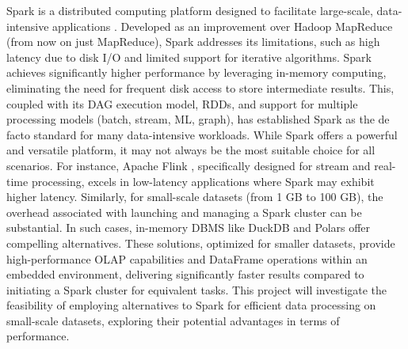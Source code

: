 \smallskip

Spark is a distributed computing platform designed to facilitate large-scale, data-intensive applications \cite{zaharia2010spark}. Developed as an improvement over Hadoop MapReduce (from now on just MapReduce), Spark addresses its limitations, such as high latency due to disk I/O and limited support for iterative algorithms. Spark achieves significantly higher performance by leveraging in-memory computing, eliminating the need for frequent disk access to store intermediate results. This, coupled with its DAG execution model, \glspl{RDD}, and support for multiple processing models (batch, stream, \gls{ML}, graph), has established Spark as the de facto standard for many data-intensive workloads.
While Spark offers a powerful and versatile platform, it may not always be the most suitable choice for all scenarios. For instance, Apache Flink \cite{carboneApacheFlinkStream}, specifically designed for stream and real-time processing, excels in low-latency applications where Spark may exhibit higher latency. Similarly, for small-scale datasets (from 1 GB to 100 GB), the overhead associated with launching and managing a Spark cluster can be substantial. In such cases, in-memory \gls{DBMS} like DuckDB \cite{raasveldtDuckDBEmbeddableAnalytical2019} and Polars \cite{vinkWroteOneFastest2021} offer compelling alternatives. These solutions, optimized for smaller datasets, provide high-performance OLAP capabilities and DataFrame operations within an embedded environment, delivering significantly faster results compared to initiating a Spark cluster for equivalent tasks.
This project will investigate the feasibility of employing alternatives to Spark for efficient data processing on small-scale datasets, exploring their potential advantages in terms of performance.

\smallskip

